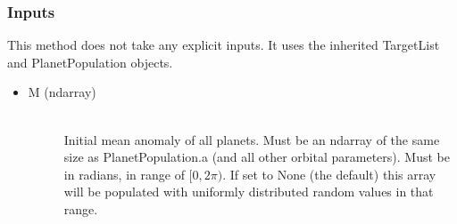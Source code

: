 \documentclass[cleanfoot]{asme2ej}
\begin{document}
\subsubsection*{Inputs}
This method does not take any explicit inputs.  It uses the inherited TargetList and PlanetPopulation objects.
\begin{itemize}
    \item 
    \begin{description}
        \item[M (ndarray)] \hfill \\
        Initial mean anomaly of all planets.  Must be an ndarray of the same size as PlanetPopulation.a (and all other orbital parameters).  Must be in radians, in range of $[0,2\pi)$. If set to None (the default) this array will be populated with uniformly distributed random values in that range.
  \end{description}
\end{itemize}
\end{document}
